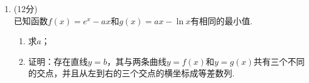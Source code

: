 \documentclass[11pt,space]{ctexart} %
\begin{document}
\begin{enumerate}[itemsep=0.5em,topsep=5pt,resume]
\item (12分)\\
已知函数$ f(x)=e^x-ax$和$g(x)=ax-\ln x$有相同的最小值.
\begin{enumerate}[itemsep=-0.3em,label={（\arabic*）},topsep=0pt,labelsep=.5em,leftmargin=3em]
	\item 求$a$；
	\item 证明：存在直线$y=b$，其与两条曲线$y=f(x)$和$y=g(x)$共有三个不同的交点，并且从左到右的三个交点的横坐标成等差数列.
\end{enumerate}

\end{enumerate}


\clearpage	
	
\end{document}
